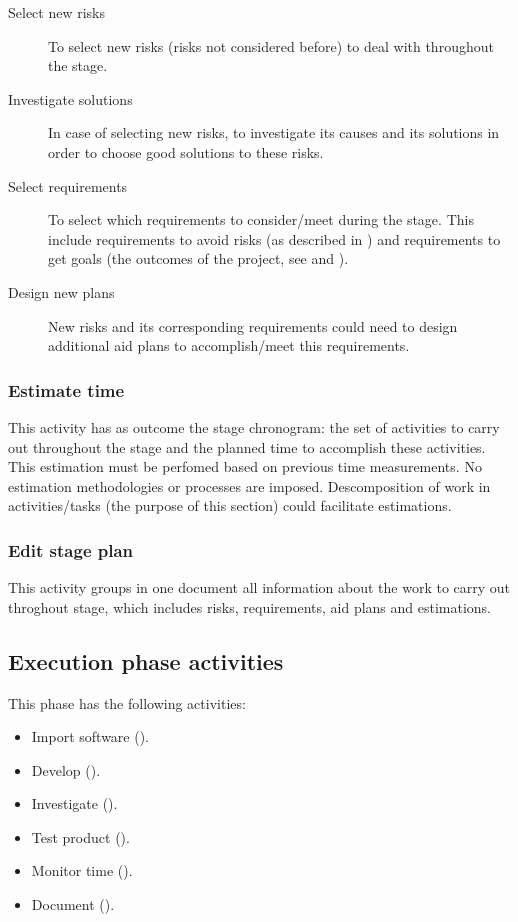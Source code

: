 \documentclass[twocolumn, 9pt]{extarticle}
\begin{document}
\begin{description}
  \item[Select new risks] To select new risks (risks not considered
    before) to deal with throughout the stage.
  \item[Investigate solutions] In case of selecting new risks, to
    investigate its causes and its solutions in order to choose good
    solutions to these risks.
  \item[Select requirements] To select which requirements to
    consider/meet during the stage. This include requirements to
    avoid risks (as described in ) and
    requirements to get goals (the outcomes of the project, see
    \fav and ).
  \item[Design new plans] New risks and its corresponding requirements
    could need to design additional aid plans to accomplish/meet
    this requirements.
\end{description}

\subsubsection{Estimate time}
\label{sssec:estimate-time}
This activity has as outcome the stage chronogram: the set of
activities to carry out throughout the stage and the planned time to
accomplish these activities. This estimation must be perfomed based on
previous time measurements. No estimation methodologies or processes
are imposed. Descomposition of work in activities/tasks (the purpose
of this section) could facilitate estimations.

\subsubsection{Edit stage plan}
\label{sssec:edit-stage-plan}
This activity groups in one document all information about the work to
carry out throghout stage, which includes risks, requirements, aid
plans and estimations.

\subsection{Execution phase activities}
\label{ssec:execution-phase}
This phase has the following activities:

\begin{itemize}
  \item Import software ().
  \item Develop ().
  \item Investigate ().
  \item Test product ().
  \item Monitor time ().
  \item Document ().
\end{itemize}
\end{document}
